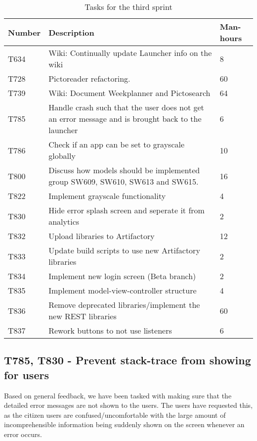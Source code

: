 \begin{table}[H]
\begin{centering}
\begin{tabular}{|l|p{9cm}|l|}
\hline
Number 	& Description & Man-hours \\ \hline
T634   	& Wiki: Continually update Launcher info on the wiki & 8\\\hline
T728  	& Pictoreader refactoring. & 60 \\ \hline
T739	& Wiki: Document Weekplanner and Pictosearch & 64\\ \hline
T785	& Handle crash such that the user does not get an error message and is
		  brought back to the launcher & 6\\ \hline
T786 	& Check if an app can be set to grayscale globally & 10\\ \hline
T800 	& Discuss how models should be implemented group SW609, SW610, SW613 and
		  SW615. & 16\\ \hline
T822 	& Implement grayscale functionality & 4\\ \hline
T830 	& Hide error splash screen and seperate it from analytics & 2\\ \hline
T832 	& Upload libraries to Artifactory & 12\\ \hline
T833 	& Update build scripts to use new Artifactory libraries & 2\\ \hline
T834 	& Implement new login screen (Beta branch) & 2\\ \hline
T835 	& Implement model-view-controller structure & 4\\ \hline
T836 	& Remove deprecated libraries/implement the new REST libraries & 60\\
\hline T837 	& Rework buttons to not use listeners & 6\\ \hline
\end{tabular}
\caption{Tasks for the third sprint}
\label{Tasks3}
\end{centering}
\end{table}

\subsection{T785, T830 - Prevent stack-trace from showing for
users}\label{T785-T830} 
Based on general feedback, we have been tasked with making sure that the
detailed error messages are not shown to the users. The users have requested
this, as the citizen users are confused/uncomfortable with the large amount of
incomprehensible information being suddenly shown on the screen whenever an
error occurs.\nl

